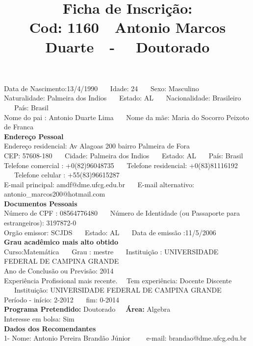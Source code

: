 \documentclass[11pt]{article}
\title{\vspace*{-4cm} Ficha de Inscrição: \\Cod: 1160\ \ Antonio Marcos Duarte\ \ - \ \ Doutorado 
 }
\date{}
\begin{document}
\maketitle
\vspace*{-1.5cm}
\noindent Data de Nascimento:13/4/1990
\ \ \ Idade: 24   \ \ \ Sexo: Masculino
\\
Naturalidade: Palmeira dos Indios  
\ \ \  Estado: AL
\ \ \  Nacionalidade: Brasileiro
\ \ \ País: Brasil
\\        
Nome do pai : Antonio Duarte Lima
\ \ \ Nome da mãe: Maria do Socorro Peixoto de Franca          
\\[0.2cm]                     
\textbf{Endereço Pessoal} 
\\ 
\noindent Endereço residencial: Av Alagoas 200 bairro Palmeira de Fora
\\
        CEP: 57608-180 
\ \ \ Cidade: Palmeira dos Indios 
\ \ \ Estado: AL 
\ \ \ País: Brasil
\\		
		Telefone comercial : +0(82)96048735
\ \ \ Telefone residencial: +0(83)81116192
\ \ \ Telefone celular : +55(83)96615287
\\
E-mail principal: amdf@dme.ufcg.edu.br
\ \ \ E-mail alternativo: antonio\_marcos200@hotmail.com 
\\[0.2cm] 
\textbf{Documentos Pessoais}
\\
\noindent Número de CPF : 08564776480
\ \ \ Número de Identidade (ou Passaporte para estrangeiros): 3197872-0
\\
Orgão emissor: SCJDS
\ \ \ Estado: AL
\ \ \ Data de emissão :11/5/2006
\\[0.3cm]
\textbf{Grau acadêmico mais alto obtido}
\\	
Curso:Matemática
\ \ \ Grau : mestre
\ \ \ Instituição : UNIVERSIDADE FEDERAL DE CAMPINA GRANDE
\\			
Ano de Conclusão ou Previsão: 2014
\\ 
Experiência Profissional mais recente. \ \  
Tem experiência: Docente Discente  
\ \ \ Instituição: UNIVERSIDADE FEDERAL DE CAMPINA GRANDE
\\  
Período - início: 2-2012
\ \ \ fim: 0-2014
\\[0.2cm] 
\textbf{Programa Pretendido:} Doutorado\ \ \ \textbf{Área:} Algebra\\
Interesse em bolsa: Sim
\\[0.3cm]		
\textbf{Dados dos Recomendantes} 
\\
1- Nome: Antonio Pereira Brandão Júnior
\ \ \ \  e-mail: brandao@dme.ufcg.edu.br 
\\
\end{document}
